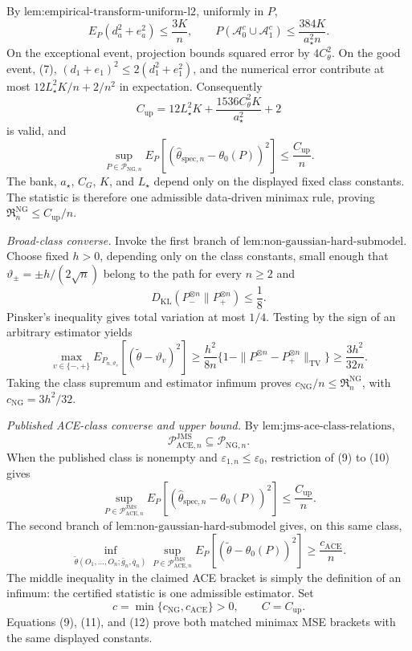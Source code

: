 By \(\text{lem:empirical-transform-uniform-l2}\), uniformly in \(P\),
\[
 E_P(d_a^2+e_a^2)\le\frac{3K}{n},
 \qquad
 P(\mathcal A_0^c\cup\mathcal A_1^c)
 \le\frac{384K}{a_{\star}^2n}.
 \tag{8}
\]
On the exceptional event, projection bounds squared error by \(4C_{\theta}^2\). On the good event, (7), \((d_1+e_1)^2\le2(d_1^2+e_1^2)\), and the numerical error contribute at most \(12L_{\star}^2K/n+2/n^2\) in expectation. Consequently
\[
 C_{\mathrm{up}}
 =12L_{\star}^2K
 +\frac{1536C_{\theta}^2K}{a_{\star}^2}+2
\]
is valid, and
\[
 \sup_{P\in\mathcal P_{\mathrm{NG},n}}
 E_P[(\widehat\theta_{\mathrm{spec},n}-\theta_0(P))^2]
 \le\frac{C_{\mathrm{up}}}{n}.
 \tag{9}
\]
The bank, \(a_{\star}\), \(C_G\), \(K\), and \(L_{\star}\) depend only on the displayed fixed class constants. The statistic is therefore one admissible data-driven minimax rule, proving \(\mathfrak R_n^{\mathrm{NG}}\le C_{\mathrm{up}}/n\).

\emph{Broad-class converse.} Invoke the first branch of \(\text{lem:non-gaussian-hard-submodel}\). Choose fixed \(h>0\), depending only on the class constants, small enough that \(\vartheta_{\pm}=\pm h/(2\sqrt n)\) belong to the path for every \(n\ge2\) and
\[
 D_{\mathrm{KL}}(P_-^{\otimes n}\|P_+^{\otimes n})\le\frac18.
\]
Pinsker's inequality gives total variation at most \(1/4\). Testing by the sign of an arbitrary estimator yields
\[
 \max_{v\in\{-,+\}}
 E_{P_{n,\vartheta_v}}[(\widetilde\theta-\vartheta_v)^2]
 \ge\frac{h^2}{8n}
 \{1-\|P_-^{\otimes n}-P_+^{\otimes n}\|_{\mathrm{TV}}\}
 \ge\frac{3h^2}{32n}.
\]
Taking the class supremum and estimator infimum proves \(c_{\mathrm{NG}}/n\le\mathfrak R_n^{\mathrm{NG}}\), with \(c_{\mathrm{NG}}=3h^2/32\).

\emph{Published ACE-class converse and upper bound.} By \(\text{lem:jms-ace-class-relations}\),
\[
 \mathcal P_{\mathrm{ACE},n}^{\mathrm{JMS}}
 \subseteq\mathcal P_{\mathrm{NG},n}.
 \tag{10}
\]
When the published class is nonempty and \(\varepsilon_{1,n}\le\varepsilon_0\), restriction of (9) to (10) gives
\[
 \sup_{P\in\mathcal P_{\mathrm{ACE},n}^{\mathrm{JMS}}}
 E_P[(\widehat\theta_{\mathrm{spec},n}-\theta_0(P))^2]
 \le\frac{C_{\mathrm{up}}}{n}.
 \tag{11}
\]
The second branch of \(\text{lem:non-gaussian-hard-submodel}\) gives, on this same class,
\[
 \inf_{\widetilde\theta(O_1,\ldots,O_n;\bar g_n,\bar q_n)}
 \sup_{P\in\mathcal P_{\mathrm{ACE},n}^{\mathrm{JMS}}}
 E_P[(\widetilde\theta-\theta_0(P))^2]
 \ge\frac{c_{\mathrm{ACE}}}{n}.
 \tag{12}
\]
The middle inequality in the claimed ACE bracket is simply the definition of an infimum: the certified statistic is one admissible estimator. Set
\[
 c=\min\{c_{\mathrm{NG}},c_{\mathrm{ACE}}\}>0,
 \qquad
 C=C_{\mathrm{up}}.
\]
Equations (9), (11), and (12) prove both matched minimax MSE brackets with the same displayed constants.


